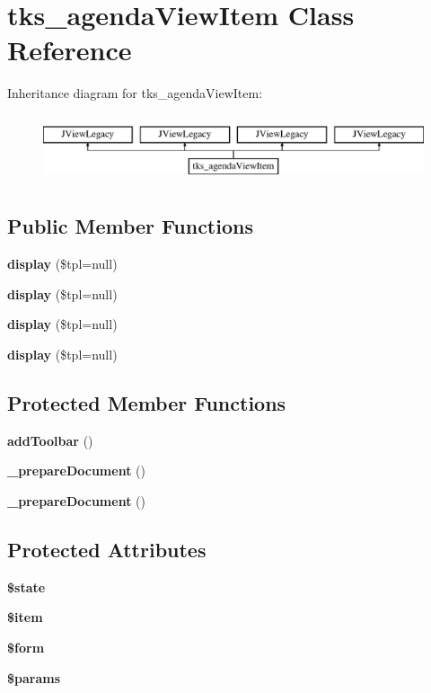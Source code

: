 \section{tks\+\_\+agenda\+View\+Item Class Reference}
\label{classtks__agenda_view_item}
Inheritance diagram for tks\+\_\+agenda\+View\+Item\+:\begin{figure}[H]
\begin{center}
\leavevmode
\includegraphics[height=2.000000cm]{classtks__agenda_view_item}
\end{center}
\end{figure}
\subsection*{Public Member Functions}
\begin{DoxyCompactItemize}
\item 
\textbf{ display} (\$tpl=null)
\item 
\textbf{ display} (\$tpl=null)
\item 
\textbf{ display} (\$tpl=null)
\item 
\textbf{ display} (\$tpl=null)
\end{DoxyCompactItemize}
\subsection*{Protected Member Functions}
\begin{DoxyCompactItemize}
\item 
\textbf{ add\+Toolbar} ()
\item 
\textbf{ \+\_\+prepare\+Document} ()
\item 
\textbf{ \+\_\+prepare\+Document} ()
\end{DoxyCompactItemize}
\subsection*{Protected Attributes}
\begin{DoxyCompactItemize}
\item 
\textbf{ \$state}
\item 
\textbf{ \$item}
\item 
\textbf{ \$form}
\item 
\textbf{ \$params}
\end{DoxyCompactItemize}


